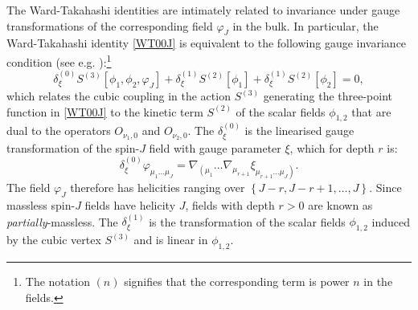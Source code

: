 \documentclass[11pt,a4paper]{article}
\begin{document}
The Ward-Takahashi identities are intimately related to invariance under gauge transformations of the corresponding field $\varphi_J$ in the bulk. In particular, the Ward-Takahashi identity \eqref{WT00J} is equivalent to the following gauge invariance condition (see e.g. \cite{Berends:1984rq}):\footnote{The notation $(n)$ signifies that the corresponding term is power $n$ in the fields.} 
\begin{equation}\label{cubiccon}
    \delta^{(0)}_{\xi}S^{\left(3\right)}\left[\phi_1,\phi_2,\varphi_J\right]+\delta^{(1)}_{\xi}S^{\left(2\right)}\left[\phi_1\right]+\delta^{(1)}_{\xi}S^{\left(2\right)}\left[\phi_2\right]=0,
\end{equation}
which relates the cubic coupling in the action $S^{\left(3\right)}$ generating the three-point function in \eqref{WT00J} to the kinetic term $S^{\left(2\right)}$ of the scalar fields $\phi_{1,2}$ that are dual to the operators $O_{\nu_{1},0}$ and $O_{\nu_{2},0}$. The $\delta^{(0)}_{\xi}$ is the linearised gauge transformation of the spin-$J$ field with gauge parameter $\xi$, which for depth $r$ is: 
\begin{equation}
    \delta^{(0)}_{\xi}\varphi_{\mu_1 \ldots \mu_J} = \nabla_{\left(\mu_1\right.} \ldots \nabla_{\mu_{r+1}} \xi_{\left. \mu_{r+1} \ldots \mu_{J}\right)}.
\end{equation}
The field $\varphi_J$ therefore has helicities ranging over $\left\{J-r, J-r+1, \ldots, J\right\}$. Since massless spin-$J$ fields have helicity $J$, fields with depth $r>0$ are known as \emph{partially}-massless. The $\delta^{(1)}_{\xi}$ is the transformation of the scalar fields $\phi_{1,2}$ induced by the cubic vertex $S^{\left(3\right)}$ and is linear in $\phi_{1,2}$.
\end{document}
